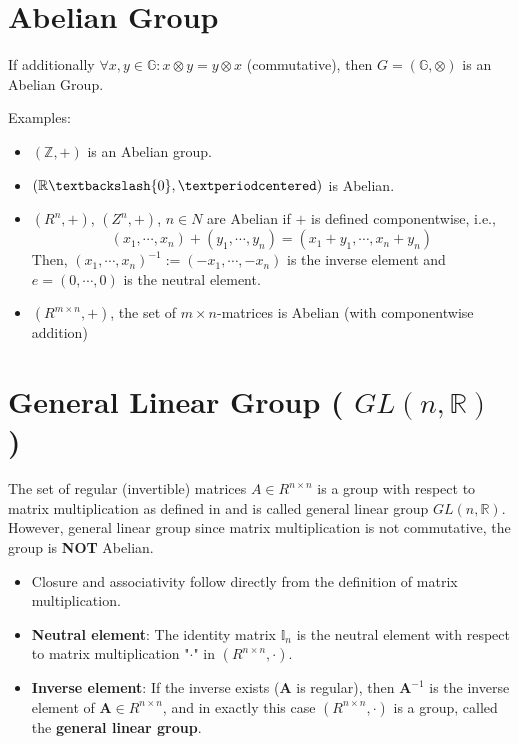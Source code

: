\section{Abelian Group \cite{mfml-1}}\label{Abelian Group}

If additionally $\forall x,y \in \mathbb{G}:x\otimes y = y\otimes x$ (commutative), then $G = (\mathbb{G}, \otimes)$ is an Abelian Group.

Examples:
\begin{itemize}
    \item $(\mathbb{Z}, +)$ is an Abelian group.
    \item $(\mathbb{R}\textbackslash {0}, ·)$ is Abelian.
    \item $(R^n, +)$, $(Z^n, +)$, $n \in N$ are Abelian if $+$ is defined componentwise, i.e., 
    \[
        (x_1, \cdots , x_n) + (y_1, \cdots , y_n) = (x_1 + y_1, \cdots , x_n + y_n)
    \]
    Then, $(x_1, \cdots , x_n)^{-1} := (-x_1, \cdots , -x_n)$ is the inverse element and $e = (0, \cdots , 0)$ is the neutral element.
    \item $(R^{m×n}, +)$, the set of $m \times n$-matrices is Abelian (with componentwise addition)
\end{itemize}

\section{General Linear Group ( $GL(n,\mathbb{R})$ ) \cite{mfml-1}}\label{General Linear Group}
The set of regular (invertible) matrices $A \in R^{n \times n}$ is a group with respect to matrix multiplication as defined in and is called general linear group $GL(n, \mathbb{R})$. However, general linear group since matrix multiplication is not commutative, the group is \textbf{NOT} Abelian.

\begin{itemize}
    \item Closure and associativity follow directly from the definition of matrix multiplication.
    
    \item \textbf{Neutral element}: The identity matrix $\mathbb{I}_n$ is the neutral element with respect to matrix multiplication "$\cdot$" in $(R^{n\times n}, \cdot)$.

    \item \textbf{Inverse element}: If the inverse exists ($\mathbf{A}$ is regular), then $\mathbf{A}^{-1}$ is the inverse element of $\mathbf{A} \in R^{n\times n}$, and in exactly this case $(R^{n\times n}, \cdot)$ is a group, called the \textbf{general linear group}.
\end{itemize}


